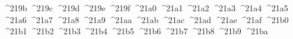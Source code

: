 {  ^^^^219b%
  ^^^^219c%
  ^^^^219d%
  ^^^^219e%
  ^^^^219f%
  ^^^^21a0%
  ^^^^21a1%
  ^^^^21a2%
  ^^^^21a3%
  ^^^^21a4%
  ^^^^21a5%
  ^^^^21a6%
  ^^^^21a7%
  ^^^^21a8%
  ^^^^21a9%
  ^^^^21aa%
  ^^^^21ab%
  ^^^^21ac%
  ^^^^21ad%
  ^^^^21ae%
  ^^^^21af%
  ^^^^21b0%
  ^^^^21b1%
  ^^^^21b2%
  ^^^^21b3%
  ^^^^21b4%
  ^^^^21b5%
  ^^^^21b6%
  ^^^^21b7%
  ^^^^21b8%
  ^^^^21b9%
  ^^^^21ba%
}
